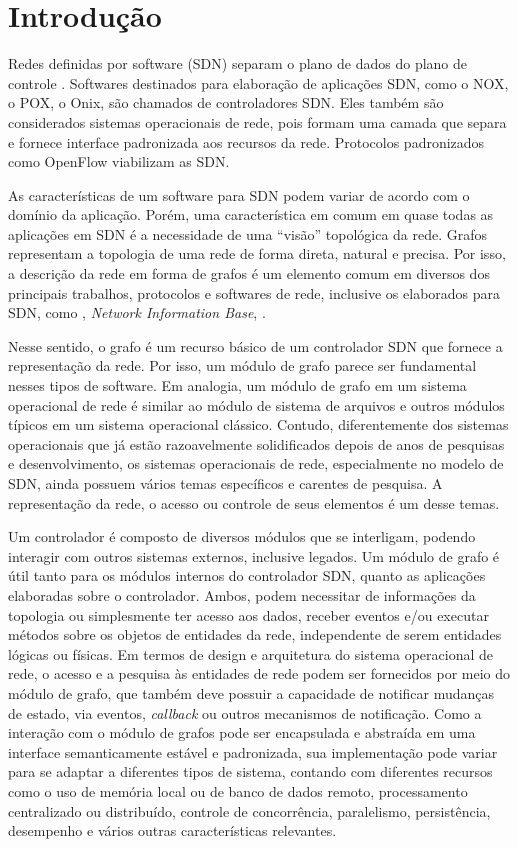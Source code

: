 \section{Introdução}
\label{sec:introduction}

Redes definidas por software (SDN) separam o plano de dados do plano 
de controle \citep{guedes2012redes}.
Softwares destinados para elaboração de aplicações SDN, 
como o NOX, o POX, o Onix, são chamados de controladores SDN.
Eles também são considerados sistemas operacionais de rede, pois 
formam uma camada que separa e fornece interface padronizada aos recursos da rede.
Protocolos padronizados como OpenFlow viabilizam as SDN.

As características de um software para SDN podem variar de acordo com o domínio da aplicação. 
Porém, uma característica em comum em quase todas as aplicações em SDN é a necessidade de 
uma ``visão'' topológica da rede.
Grafos representam a topologia de uma rede de forma direta, natural e precisa. 
Por isso, a descrição da rede em forma de grafos é um elemento comum em diversos
dos principais trabalhos, protocolos e softwares de rede, 
inclusive os elaborados para SDN,
como \citep{martin2010virtualizing}, \emph{Network Information Base}, \citep{ramya2012dynamic}.

Nesse sentido, o grafo é um recurso básico de um controlador SDN
que fornece a representação da rede.
Por isso, um módulo de grafo parece ser fundamental nesses tipos de software.
Em analogia, um módulo de grafo em um sistema operacional de rede é 
similar ao módulo de sistema de arquivos e outros módulos típicos 
em um sistema operacional clássico.
Contudo, diferentemente dos sistemas operacionais que já estão 
razoavelmente solidificados depois de anos de pesquisas e desenvolvimento,
os sistemas operacionais de rede, especialmente no modelo de SDN, 
ainda possuem vários temas específicos e carentes de pesquisa.
A representação da rede, o acesso ou controle de seus elementos
é um desse temas.

Um controlador é composto de diversos módulos que se interligam, 
podendo interagir com outros sistemas externos, 
inclusive legados. 
Um módulo de grafo é útil tanto para os módulos internos do controlador SDN,
quanto as aplicações elaboradas sobre o controlador.
Ambos, podem necessitar de informações da topologia ou 
simplesmente ter acesso aos dados, receber eventos e/ou
executar métodos sobre os objetos de entidades da rede, 
independente de serem entidades lógicas ou físicas.
Em termos de design e arquitetura do sistema operacional de rede, 
o acesso e a pesquisa às entidades de rede podem ser fornecidos 
por meio do módulo de grafo,
que também deve possuir a capacidade de notificar mudanças de estado, 
via eventos, \emph{callback} ou outros mecanismos de notificação.
Como a interação com o módulo de grafos pode ser encapsulada e abstraída 
em uma interface semanticamente estável e padronizada,
sua implementação pode variar para se adaptar a diferentes tipos de sistema, 
contando com diferentes recursos como o 
uso de memória local ou de banco de dados remoto, 
processamento centralizado ou distribuído, 
controle de concorrência, paralelismo, persistência, desempenho e 
vários outras características relevantes.

